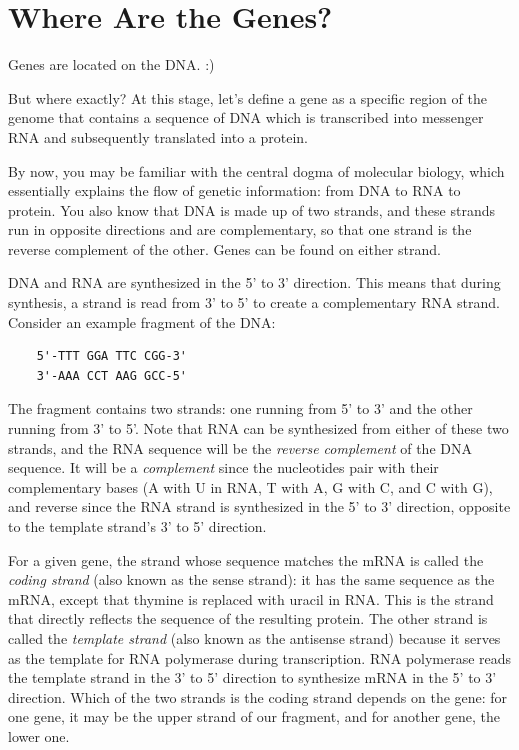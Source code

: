 \chapter{Where Are the Genes?}
\label{ch:genes}
Genes are located on the DNA. :)

But where exactly? At this stage, let's define a gene as a specific region of the genome that contains a sequence of DNA which is transcribed into messenger RNA and subsequently translated into a protein.

By now, you may be familiar with the central dogma of molecular biology, which essentially explains the flow of genetic information: from DNA to RNA to protein. You also know that DNA is made up of two strands, and these strands run in opposite directions and are complementary, so that one strand is the reverse complement of the other. Genes can be found on either strand.

DNA and RNA are synthesized in the 5' to 3' direction. This means that during synthesis, a strand is read from 3' to 5' to create a complementary RNA strand. Consider an example fragment of the DNA:

\begin{verbatim}
    5'-TTT GGA TTC CGG-3'
    3'-AAA CCT AAG GCC-5'
\end{verbatim}

The fragment contains two strands: one running from 5' to 3' and the other running from 3' to 5'. Note that RNA can be synthesized from either of these two strands, and the RNA sequence will be the {\em reverse complement} of the DNA sequence. It will be a {\em complement} since the nucleotides pair with their complementary bases (A with U in RNA, T with A, G with C, and C with G), and reverse since the RNA strand is synthesized in the 5' to 3' direction, opposite to the template strand's 3' to 5' direction.

For a given gene, the strand whose sequence matches the mRNA is called the {\em coding strand} (also known as the sense strand): it has the same sequence as the mRNA, except that thymine is replaced with uracil in RNA. This is the strand that directly reflects the sequence of the resulting protein. The other strand is called the {\em template strand} (also known as the antisense strand) because it serves as the template for RNA polymerase during transcription. RNA polymerase reads the template strand in the 3' to 5' direction to synthesize mRNA in the 5' to 3' direction. Which of the two strands is the coding strand depends on the gene: for one gene, it may be the upper strand of our fragment, and for another gene, the lower one.


